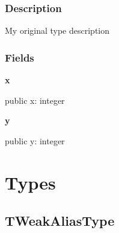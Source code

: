 \documentclass{report}
\newif\ifpdf
\begin{document}
\subsubsection*{\large{\textbf{Description}}\normalsize\hspace{1ex}\hfill}
My original type description\subsubsection*{\large{\textbf{Fields}}\normalsize\hspace{1ex}\hfill}
\begin{list}{}{
\setlength{\itemindent}{0cm}
\setlength{\listparindent}{0cm}
\setlength{\leftmargin}{\evensidemargin}
\addtolength{\leftmargin}{\tmplength}
\settowidth{\labelsep}{X}
\addtolength{\leftmargin}{\labelsep}
\setlength{\labelwidth}{\tmplength}
}
\label{ok_type_aliases.TOriginalType-x}
\item[\textbf{x}\hfill]
\ifpdf
\begin{flushleft}
\fi
\begin{ttfamily}
public x: integer \end{ttfamily}

\ifpdf
\end{flushleft}
\fi


\par  \label{ok_type_aliases.TOriginalType-y}
\item[\textbf{y}\hfill]
\ifpdf
\begin{flushleft}
\fi
\begin{ttfamily}
public y: integer \end{ttfamily}

\ifpdf
\end{flushleft}
\fi


\par  \end{list}
\section{Types}
\ifpdf
\subsection*{\large{\textbf{TWeakAliasType}}\normalsize\hspace{1ex}\hrulefill}
\else
\end{document}
